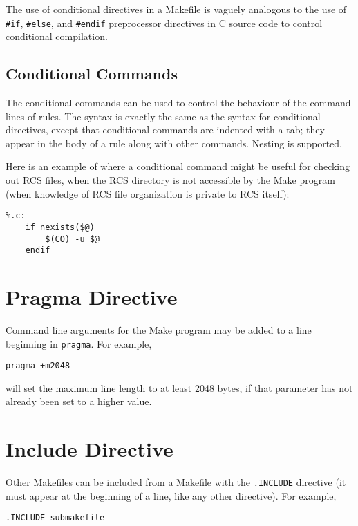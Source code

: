 The use of conditional directives in a Makefile is vaguely analogous to the
use of {\tt \#{}if}, {\tt \#{}else}, and {\tt \#{}endif} preprocessor
directives in C source code to control conditional compilation.


\subsection{Conditional Commands}

\label{condcmds}

The conditional commands can be used to control the behaviour of the
command lines of rules.  The syntax is exactly the same as the syntax for
conditional directives, except that conditional commands are indented with
a tab; they appear in the body of a rule along with other commands.
Nesting is supported.

Here is an example of where a conditional command might be useful for
checking out RCS files, when the RCS directory is not accessible by the
Make program (when knowledge of RCS file organization is private to RCS
itself):

\begin{verbatim}
%.c:
    if nexists($@)
        $(CO) -u $@
    endif
\end{verbatim}


\section{Pragma Directive}

Command line arguments for the Make program may be added to a line
beginning in {\tt pragma}.  For example,

\begin{verbatim}
pragma +m2048
\end{verbatim}

will set the maximum line length to at least 2048 bytes, if that parameter
has not already been set to a higher value.


\section{Include Directive}

Other Makefiles can be included from a Makefile with the {\tt .INCLUDE}
directive (it must appear at the beginning of a line, like any other
directive).  For example,

\begin{verbatim}
.INCLUDE submakefile
\end{verbatim}


